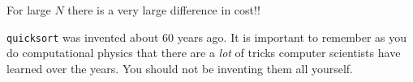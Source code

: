 For large $N$ there is a very large difference in cost!!

{\tt quicksort} was invented about 60 years ago. It is important to
remember as you do computational physics that there are a {\it lot} of
tricks computer scientists have learned over the years. You should not
be inventing them all yourself.
